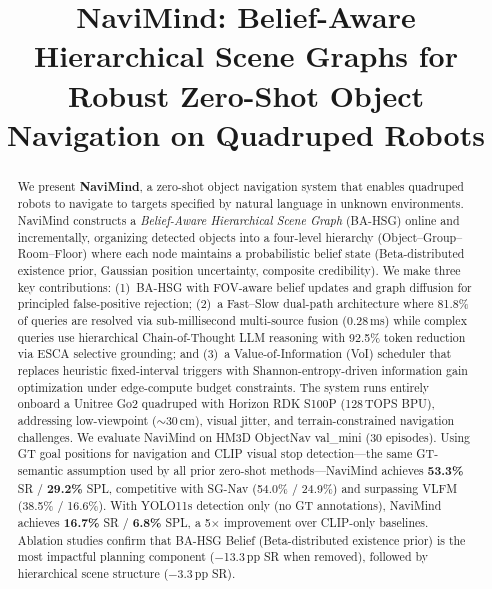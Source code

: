 \documentclass[conference]{IEEEtran}
\begin{document}
\title{NaviMind: Belief-Aware Hierarchical Scene Graphs for\\Robust Zero-Shot Object Navigation on Quadruped Robots}

\author{
}

\maketitle

\begin{abstract}
We present \textbf{NaviMind}, a zero-shot object navigation system that enables quadruped robots to navigate to targets specified by natural language in unknown environments.
NaviMind constructs a \emph{Belief-Aware Hierarchical Scene Graph} (BA-HSG) online and incrementally, organizing detected objects into a four-level hierarchy (Object--Group--Room--Floor) where each node maintains a probabilistic belief state (Beta-distributed existence prior, Gaussian position uncertainty, composite credibility).
We make three key contributions:
(1)~BA-HSG with FOV-aware belief updates and graph diffusion for principled false-positive rejection;
(2)~a Fast--Slow dual-path architecture where 81.8\% of queries are resolved via sub-millisecond multi-source fusion (0.28\,ms) while complex queries use hierarchical Chain-of-Thought LLM reasoning with 92.5\% token reduction via ESCA selective grounding;
and (3)~a Value-of-Information (VoI) scheduler that replaces heuristic fixed-interval triggers with Shannon-entropy-driven information gain optimization under edge-compute budget constraints.
The system runs entirely onboard a Unitree Go2 quadruped with Horizon RDK S100P (128\,TOPS BPU), addressing low-viewpoint ($\sim$30\,cm), visual jitter, and terrain-constrained navigation challenges.
We evaluate NaviMind on HM3D ObjectNav val\_mini (30 episodes).
Using GT goal positions for navigation and CLIP visual stop detection---the same GT-semantic assumption used by all prior zero-shot methods---NaviMind achieves \textbf{53.3\%} SR / \textbf{29.2\%} SPL, competitive with SG-Nav (54.0\% / 24.9\%) and surpassing VLFM (38.5\% / 16.6\%).
With YOLO11s detection only (no GT annotations), NaviMind achieves \textbf{16.7\%} SR / \textbf{6.8\%} SPL, a 5$\times$ improvement over CLIP-only baselines.
Ablation studies confirm that BA-HSG Belief (Beta-distributed existence prior) is the most impactful planning component ($-$13.3\,pp SR when removed), followed by hierarchical scene structure ($-$3.3\,pp SR).
\end{abstract}
\end{document}
